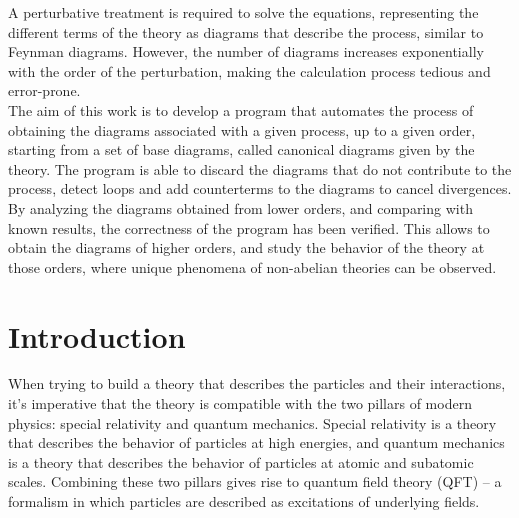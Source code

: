 \documentclass[11pt,a4paper,twoside,pdf]{article}
\numberwithin{equation}{section}
\begin{document}
\begin{center}
\begin{minipage}{0.8\linewidth}
A perturbative treatment is required to solve the equations, representing the different
terms of the theory as diagrams that describe the process, similar to Feynman diagrams.
However, the number of diagrams increases exponentially with the order of the perturbation,
making the calculation process tedious and error-prone. \\

The aim of this work is to develop a program \cite{Liu_Computational_tools_for_2025} that automates the process of
obtaining the diagrams associated with a given process, up to a given order,
starting from a set of base diagrams, called canonical diagrams given by the
theory. The program is able to discard the diagrams that do not contribute to the
process, detect loops and add counterterms to the diagrams to cancel divergences. \\

By analyzing the diagrams obtained from lower orders, and comparing with known
results, the correctness of the program has been verified. This allows to obtain
the diagrams of higher orders, and study the behavior of the theory at those
orders, where unique phenomena of non-abelian theories can be observed.

\end{minipage}

\newpage

\end{center}


\pagestyle{empty}       %
\tableofcontents
\setcounter{page}{0}       %


\pagestyle{fancy}
\fancyhead[RO,LE]{\leftmark}
\fancyhead[LO,RE]{\thepage}
\fancyfoot{}

\newpage

\section{Introduction}

When trying to build a theory that describes the particles and their interactions, 
it's imperative that the theory is compatible with the two pillars of modern physics:
special relativity and quantum mechanics. Special relativity is a theory 
that describes the behavior of particles at high energies, and quantum 
mechanics is a theory that describes the behavior of particles at atomic and subatomic scales.
Combining these two pillars gives rise to quantum field theory (QFT) – a formalism 
in which particles are described as excitations of underlying fields.
\end{document}
